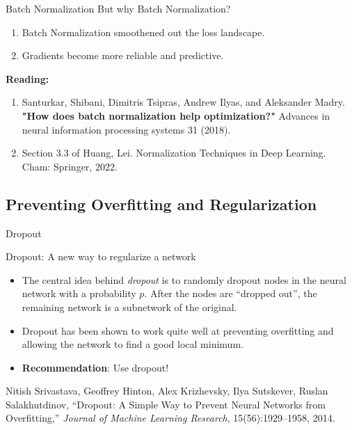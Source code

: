 \documentclass[aspectratio=169,xcolor=dvipsnames,svgnames,x11names,fleqn]{beamer}
\begin{document}
\begin{frame}{Batch Normalization}
    But why Batch Normalization?

    \pause 

    \begin{enumerate}
        \item Batch Normalization smoothened out the loss landscape.
        \item Gradients become more reliable and predictive.
    \end{enumerate}

    \bigskip

    \small

\textbf{Reading:}

    \footnotesize


\begin{enumerate}
    \item Santurkar, Shibani, Dimitris Tsipras, Andrew Ilyas, and Aleksander Madry. \textbf{"How does batch normalization help optimization?"} Advances in neural information processing systems 31 (2018).
    \item Section 3.3 of Huang, Lei. Normalization Techniques in Deep Learning. Cham: Springer, 2022.
\end{enumerate}

\end{frame}


\subsection{Preventing Overfitting and Regularization}

\begin{frame}
    \subsectionpage
\end{frame}


\begin{frame}{Dropout}

\begin{tblock}{Dropout: A new way to regularize a network}
\begin{itemize}
    \item The central idea behind {\em\color{MediumBlue}dropout} is to randomly dropout nodes in the neural network with a probability $p$. After the nodes are ``dropped out'', the remaining network is a subnetwork of the original. 
    \item Dropout has been shown to work quite well at preventing overfitting and allowing the network to find a good local minimum. 
    \item {\bf\color{MediumRed}Recommendation}: Use dropout! 
\end{itemize}
\end{tblock}
{\footnotesize
Nitish Srivastava, Geoffrey Hinton, Alex Krizhevsky, Ilya Sutskever, Ruslan Salakhutdinov, ``Dropout: A Simple Way to Prevent Neural Networks from Overfitting,'' {\em Journal of Machine Learning Research}, 15(56):1929--1958, 2014.}
\end{frame}
\end{document}
